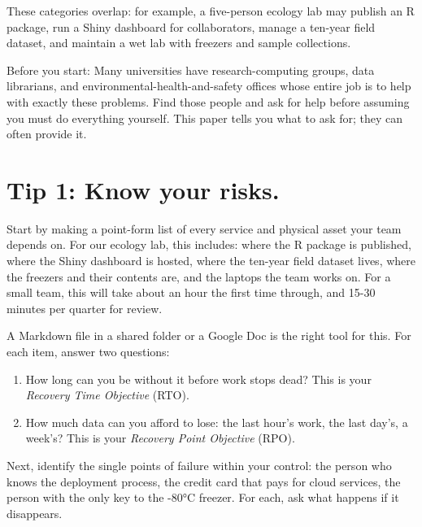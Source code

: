\documentclass[10pt,letterpaper]{article}
\begin{document}
These categories overlap: for example, a five-person ecology lab may publish an
R package, run a Shiny dashboard for collaborators, manage a ten-year field
dataset, and maintain a wet lab with freezers and sample collections.

\begin{notebox}

Before you start: Many universities have research-computing groups, data
librarians, and environmental-health-and-safety offices whose entire job is to
help with exactly these problems. Find those people and ask for help before
assuming you must do everything yourself. This paper tells you what to ask
for; they can often provide it.

\end{notebox}

\section*{Tip 1: Know your risks.}

Start by making a point-form list of every service and physical asset your
team depends on. For our ecology lab, this includes: where the R package is
published, where the Shiny dashboard is hosted, where the ten-year field
dataset lives, where the freezers and their contents are, and the laptops
the team works on. For a small team, this will take about an hour the first
time through, and 15-30 minutes per quarter for review.

A Markdown file in a shared folder or a Google Doc is the right tool for
this. For each item, answer two questions:

\begin{enumerate}

\item
  How long can you be without it before work stops dead? This is your
  \emph{Recovery Time Objective} (RTO).

\item
  How much data can you afford to lose: the last hour's work, the last
  day's, a week's? This is your \emph{Recovery Point Objective} (RPO).

\end{enumerate}

Next, identify the single points of failure within your control: the person
who knows the deployment process, the credit card that pays for cloud
services, the person with the only key to the -80°C freezer. For each, ask
what happens if it disappears.
\end{document}
